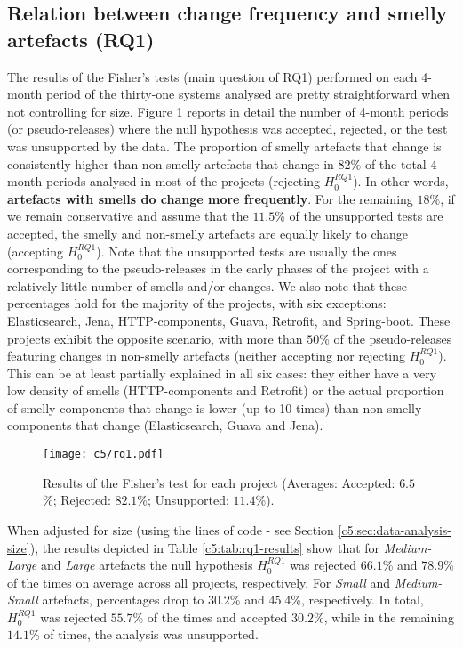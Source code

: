 \subsection{Relation between change frequency and smelly artefacts (RQ1)}
The results of the Fisher's tests (main question of RQ1) performed on each 4-month period of the thirty-one systems analysed are pretty straightforward when not controlling for size.
Figure \ref{c5:fig:rq1-results} reports in detail the number of 4-month periods (or pseudo-releases) where the null hypothesis was accepted, rejected, or the test was unsupported by the data.
The proportion of smelly artefacts that change is consistently higher than non-smelly artefacts that change in $82$\% of the total 4-month periods analysed in most of the projects (rejecting $H^{RQ1}_0$). In other words, \textbf{artefacts with smells do change more frequently}. For the remaining $18$\%, if we remain conservative and assume that the $11.5$\% of the unsupported tests are accepted, the smelly and non-smelly artefacts are equally likely to change (accepting $H^{RQ1}_0$).
Note that the unsupported tests are usually the ones corresponding to the pseudo-releases in the early phases of the project with a relatively little number of smells and/or changes.
We also note that these percentages hold for the majority of the projects, with six exceptions: Elasticsearch, Jena, HTTP-components, Guava, Retrofit, and Spring-boot.
These projects exhibit the opposite scenario, with more than $50$\% of the pseudo-releases featuring changes in non-smelly artefacts (neither accepting nor rejecting $H^{RQ1}_0$).
This can be at least partially explained in all six cases: they either have a very low density of smells (HTTP-components and Retrofit) or the actual proportion of smelly components that change is lower (up to 10 times) than non-smelly components that change (Elasticsearch, Guava and Jena).
\begin{figure}[t]
    \centering
    \texttt{[image: c5/rq1.pdf]}
    \caption{Results of the Fisher's test for each project (Averages: Accepted: $6.5$\%; Rejected: $82.1$\%; Unsupported: $11.4$\%).}\label{c5:fig:rq1-results}
\end{figure}

When adjusted for size (using the lines of code - see Section \ref{c5:sec:data-analysis-size}), the results depicted in Table \ref{c5:tab:rq1-results} show that 
for \emph{Medium-Large} and \emph{Large} artefacts the null hypothesis $H^{RQ1}_0$ was rejected $66.1$\% and $78.9$\% of the times on average across all projects, respectively.
For \emph{Small} and \emph{Medium-Small} artefacts, percentages drop to $30.2$\% and $45.4$\%, respectively.
In total,  $H^{RQ1}_0$ was rejected $55.7$\% of the times and accepted $30.2$\%, while in the remaining $14.1$\% of times, the analysis was unsupported.

